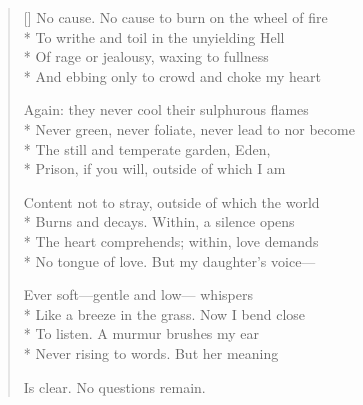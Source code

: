 \label{ch:lear_bv}
\settowidth{\versewidth}{Never green, never foliate, never lead to nor become}
\begin{verse}[\versewidth]
No cause. No cause to burn on the wheel of fire\\*
To writhe and toil in the unyielding Hell\\*
Of rage or jealousy, waxing to fullness\\*
And ebbing only to crowd and choke my heart

Again: they never cool their sulphurous flames\\*
Never green, never foliate, never lead to nor become\\*
The still and temperate garden, Eden,\\*
Prison, if you will, outside of which I am

Content not to stray, outside of which the world\\*
Burns and decays. Within, a silence opens\\*
The heart comprehends; within, love demands\\*
No tongue of love. But my daughter's voice---

Ever soft---gentle and low--- whispers\\*
Like a breeze in the grass. Now I bend close\\*
To listen. A murmur brushes my ear\\*
Never rising to words. But her meaning

Is clear. No questions remain.
\end{verse}

